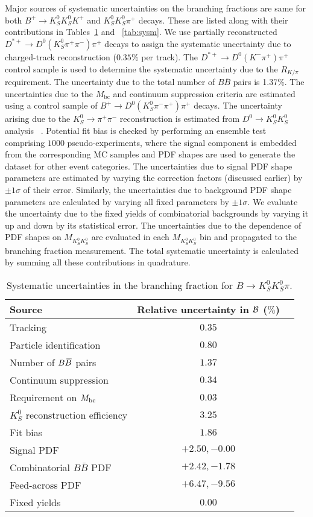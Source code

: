 \documentclass[aps,prl,preprint,tightenlines,superscriptaddress,,amsmath,byrevtex]{revtex4}
\def\pip    {\ensuremath{\pi^+}\xspace}
\def\pim    {\ensuremath{\pi^-}\xspace}
\def\Km     {\ensuremath{K^-}\xspace}
\def\KS     {\ensuremath{K^0_{\scriptscriptstyle S}}\xspace}
\def\Dz     {\ensuremath{D^0}\xspace}
\def\Dstarp {\ensuremath{D^{*+}}\xspace}
\def\Bbar   {\kern 0.18em\overline{\kern -0.18em B}{}\xspace}
\def\BB     {\ensuremath{B\Bbar}\xspace}
\newcommand{\mkk}{\ensuremath{M_{K_{S}^{0}K_{S}^{0}}}\xspace}
\def\mbc    {\mbox{$M_{\rm bc}$}\xspace}
\def\to{\ensuremath{\rightarrow}\xspace}
\begin{document}
Major sources of systematic uncertainties on the branching fractions are same for both  $B^{+}\to\KS\KS K^{+}$ and $\KS\KS \pi^{+}$ decays. These are listed along with their contributions in Tables~\ref{tab:sys1} and ~\ref{tab:sysm}. We use partially reconstructed $\Dstarp\to\Dz(\KS\pip\pim)\pip$ decays to assign the systematic uncertainty due to charged-track reconstruction ($0.35\%$ per track). The $\Dstarp\to\Dz(\Km\pip)\pip$ control sample is used to determine the systematic uncertainty due to the $R_{K/\pi}$ requirement. The uncertainty due to the total number of $B \bar{B}$ pairs is 1.37\%. The uncertainties due to the $M_{\mathrm{bc}}$ and continuum suppression criteria are estimated using a control sample of $B^+\rightarrow \Dz(\KS\pi^-\pi^+)\pi^+$ decays. The uncertainty arising due to the $K^{0}_{S} \rightarrow \pi^{+} \pi^{-}$ reconstruction is estimated from $D^{0}\rightarrow K^{0}_{S}K^{0}_{S}$ analysis ~\cite{Dash:paper}. Potential fit bias is checked by performing an ensemble test comprising $1000$ pseudo-experiments, where the signal component is embedded from the corresponding MC samples and PDF shapes are used to generate the dataset for other event categories. The uncertainties due to signal PDF shape parameters are estimated by varying  the correction factors (discussed earlier) by $\pm 1 \sigma$ of their error. Similarly, the uncertainties due to background PDF shape parameters are calculated by varying all fixed parameters by $\pm1\sigma$. We evaluate the uncertainty due to the fixed yields of combinatorial backgrounds by varying it up and down by its statistical error. The uncertainties due to the dependence of PDF shapes on $\mkk$ are evaluated in each $\mkk$ bin and propagated to the branching fraction measurement. The total systematic uncertainty is calculated by summing all these contributions in quadrature.
\begin{table}[H]
\caption{\label{tab:sys1}Systematic uncertainties in the branching fraction for $B \to\KS\KS \pi$.}
\begin{center}
\begin{tabular}{lcc}
\hline\hline
{Source} &  Relative uncertainty in ${\cal B}$ ($\%$) \\
\hline
Tracking & $0.35$ \\
Particle identification & $0.80$ \\
Number of $\BB$ pairs & $1.37$ \\
Continuum suppression & $0.34$ \\
Requirement on $\mbc$ & $0.03$ \\
$\KS$ reconstruction efficiency & $3.25$ \\
Fit bias & $1.86$ \\
Signal PDF & $+2.50, -0.00$ \\
Combinatorial $B\bar{B}$ PDF & $+2.42, -1.78$ \\
Feed-across PDF& $+6.47, -9.56$ \\
Fixed yields&  $0.00$   \\
\hline\hline
\end{tabular}
\end{center}
\end{table}
\end{document}
